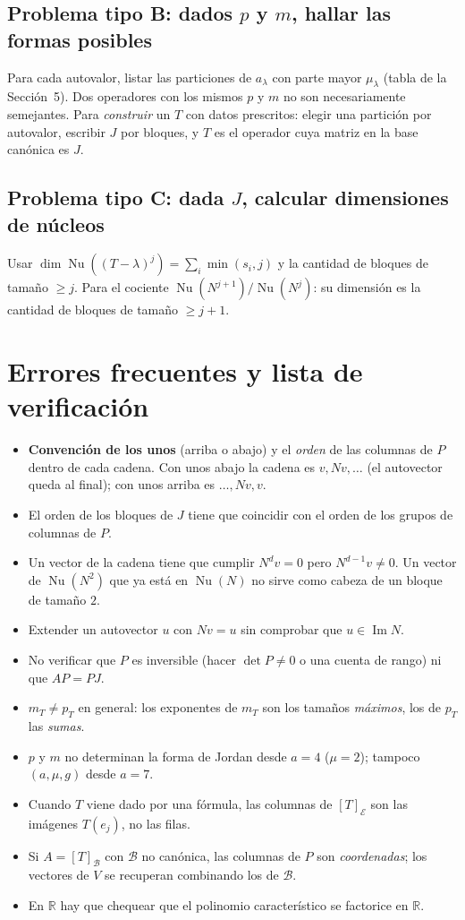 \documentclass{article}
\newcommand{\R}{\mathbb{R}}
\DeclareMathOperator{\Ima}{Im}
\DeclareMathOperator{\Nu}{Nu}
\theoremstyle{plain}
\theoremstyle{definition}
\theoremstyle{remark}
\begin{document}
\subsection{Problema tipo B: dados \(p\) y \(m\), hallar las formas posibles}
Para cada autovalor, listar las particiones de \(a_\lambda\) con parte mayor \(\mu_\lambda\) (tabla de la Sección~5). Dos operadores con los mismos \(p\) y \(m\) no son necesariamente semejantes. Para \emph{construir} un \(T\) con datos prescritos: elegir una partición por autovalor, escribir \(J\) por bloques, y \(T\) es el operador cuya matriz en la base canónica es \(J\).

\subsection{Problema tipo C: dada \(J\), calcular dimensiones de núcleos}
Usar \(\dim\Nu((T-\lambda)^j)=\sum_i\min(s_i,j)\) y la cantidad de bloques de tamaño \(\ge j\). Para el cociente \(\Nu(N^{j+1})/\Nu(N^j)\): su dimensión es la cantidad de bloques de tamaño \(\ge j+1\).

\section{Errores frecuentes y lista de verificación}

\begin{itemize}
    \item \textbf{Convención de los unos} (arriba o abajo) y el \emph{orden} de las columnas de \(P\) dentro de cada cadena. Con unos abajo la cadena es \(v,Nv,\dots\) (el autovector queda al final); con unos arriba es \(\dots,Nv,v\).
    \item El orden de los bloques de \(J\) tiene que coincidir con el orden de los grupos de columnas de \(P\).
    \item Un vector de la cadena tiene que cumplir \(N^dv=0\) pero \(N^{d-1}v\ne0\). Un vector de \(\Nu(N^2)\) que ya está en \(\Nu(N)\) no sirve como cabeza de un bloque de tamaño \(2\).
    \item Extender un autovector \(u\) con \(Nv=u\) sin comprobar que \(u\in\Ima N\).
    \item No verificar que \(P\) es inversible (hacer \(\det P\ne0\) o una cuenta de rango) ni que \(AP=PJ\).
    \item \(m_T\ne p_T\) en general: los exponentes de \(m_T\) son los tamaños \emph{máximos}, los de \(p_T\) las \emph{sumas}.
    \item \(p\) y \(m\) no determinan la forma de Jordan desde \(a=4\) (\(\mu=2\)); tampoco \((a,\mu,g)\) desde \(a=7\).
    \item Cuando \(T\) viene dado por una fórmula, las columnas de \([T]_{\mathcal E}\) son las imágenes \(T(e_j)\), no las filas.
    \item Si \(A=[T]_{\mathcal B}\) con \(\mathcal B\) no canónica, las columnas de \(P\) son \emph{coordenadas}; los vectores de \(V\) se recuperan combinando los de \(\mathcal B\).
    \item En \(\R\) hay que chequear que el polinomio característico se factorice en \(\R\).
\end{itemize}
\end{document}
